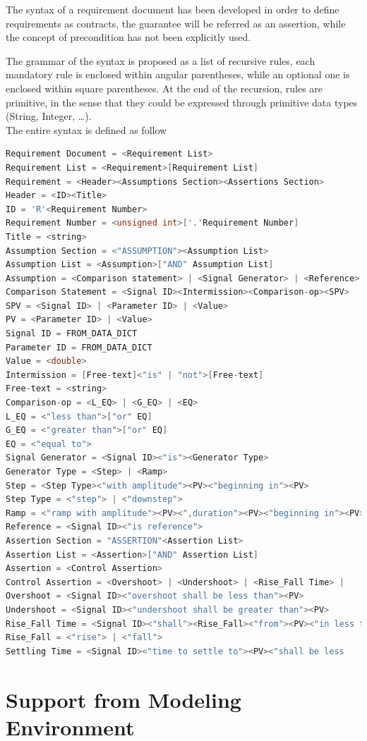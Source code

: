 The syntax of a requirement document has been developed in order to define requirements as contracts, the guarantee will be referred as an assertion, while the concept of precondition has not been explicitly used.
\par The grammar of the syntax is proposed as a list of recursive rules, each mandatory rule is enclosed within angular parentheses, while an optional one is enclosed within square parentheses. At the end of the recursion, rules are primitive, in the sense that they could be expressed through primitive data types (String, Integer, \dots). 
\noindent
\\
The entire syntax is defined as follow
\begin{lstlisting}[language=C]
Requirement Document = <Requirement List>
Requirement List = <Requirement>[Requirement List]
Requirement = <Header><Assumptions Section><Assertions Section>
Header = <ID><Title>
ID = 'R'<Requirement Number>
Requirement Number = <unsigned int>['.'Requirement Number]
Title = <string>
Assumption Section = <"ASSUMPTION"><Assumption List>
Assumption List = <Assumption>["AND" Assumption List]
Assumption = <Comparison statement> | <Signal Generator> | <Reference>
Comparison Statement = <Signal ID><Intermission><Comparison-op><SPV>
SPV = <Signal ID> | <Parameter ID> | <Value>
PV = <Parameter ID> | <Value>
Signal ID = FROM_DATA_DICT
Parameter ID = FROM_DATA_DICT
Value = <double>
Intermission = [Free-text]<"is" | "not">[Free-text]
Free-text = <string>
Comparison-op = <L_EQ> | <G_EQ> | <EQ>
L_EQ = <"less than">["or" EQ]
G_EQ = <"greater than">["or" EQ]
EQ = <"equal to">
Signal Generator = <Signal ID><"is"><Generator Type>
Generator Type = <Step> | <Ramp>
Step = <Step Type><"with amplitude"><PV><"beginning in"><PV>
Step Type = <"step"> | <"downstep">
Ramp = <"ramp with amplitude"><PV><",duration"><PV><"beginning in"><PV>
Reference = <Signal ID><"is reference">
Assertion Section = "ASSERTION"<Assertion List>
Assertion List = <Assertion>["AND" Assertion List]
Assertion = <Control Assertion>
Control Assertion = <Overshoot> | <Undershoot> | <Rise_Fall Time> |       <Settling Time>
Overshoot = <Signal ID><"overshoot shall be less than"><PV>
Undershoot = <Signal ID><"undershoot shall be greater than"><PV>
Rise_Fall Time = <Signal ID><"shall"><Rise_Fall><"from"><PV><"in less than"><PV>
Rise_Fall = <"rise"> | <"fall">
Settling Time = <Signal ID><"time to settle to"><PV><"shall be less        than"><PV>
\end{lstlisting}

\section{Support from Modeling Environment}

